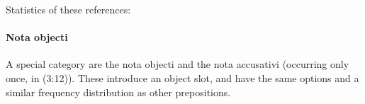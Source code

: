 \documentclass{report}
\newcommand{\hebr}[1]{\hbox{\cjRL{#1}}}
\begin{document}
Statistics of these references:

\noindent
\begin{minipage}{.5\textwidth}

\end{minipage}
\begin{minipage}{.5\textwidth}
\centering

\end{minipage}


%
%

\paragraph{Nota objecti \hebr{>T}}
A special category are the nota objecti \hebr{>T} and the nota accusativi \hebr{JT} (occurring only once, in (3:12)). These introduce an object slot, and have the same options and a similar frequency distribution as other prepositions.
\end{document}
